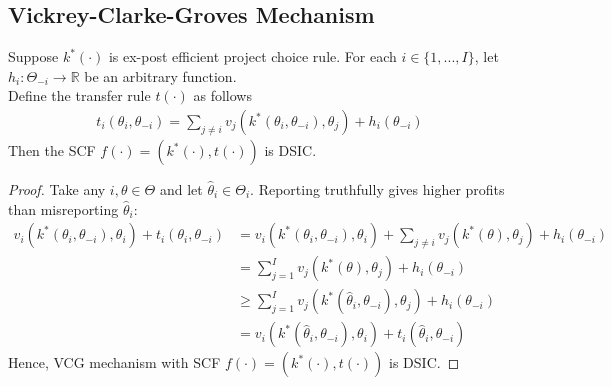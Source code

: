 \documentclass[11pt]{elegantbook_2}
\begin{document}
\subsection{Vickrey-Clarke-Groves Mechanism}
\begin{proposition}
    Suppose $k^*(\cdot)$ is ex-post efficient project choice rule. For each $i\in \{1,...,I\}$, let $h_i:\Theta_{-i} \rightarrow \mathbb{R}$ be an arbitrary function.\\
    Define the transfer rule $t(\cdot)$ as follows
    \begin{equation}
        \begin{aligned}
            t_i(\theta_i,\theta_{-i})=\sum_{j\neq i}v_j(k^*(\theta_i,\theta_{-i}),\theta_j)+h_i(\theta_{-i})
        \end{aligned}
        \nonumber
    \end{equation}
    Then the SCF $f(\cdot)=\left(k^*(\cdot),t(\cdot)\right)$ is DSIC.
\end{proposition}
\begin{proof}
    Take any $i,\theta\in\Theta$ and let $\hat{\theta}_i\in\Theta_i$.
    Reporting truthfully gives higher profits than misreporting $\hat{\theta}_i$:
        \begin{equation}
            \begin{aligned}
                v_i(k^*(\theta_i,\theta_{-i}),\theta_i)+t_i(\theta_i,\theta_{-i})&=v_i(k^*(\theta_i,\theta_{-i}),\theta_i)+\sum_{j\neq i}v_j(k^*(\theta),\theta_j)+h_i(\theta_{-i})\\
                &=\sum_{j=1}^Iv_j(k^*(\theta),\theta_j)+h_i(\theta_{-i})\\
                &\geq \sum_{j=1}^Iv_j(k^*(\hat{\theta}_i,\theta_{-i}),\theta_j)+h_i(\theta_{-i})\\
                &=v_i(k^*(\hat{\theta}_i,\theta_{-i}),\theta_i)+t_i(\hat{\theta}_i,\theta_{-i})
            \end{aligned}
            \nonumber
        \end{equation}
    Hence, VCG mechanism with SCF $f(\cdot)=\left(k^*(\cdot),t(\cdot)\right)$ is DSIC.
\end{proof}
\end{document}
